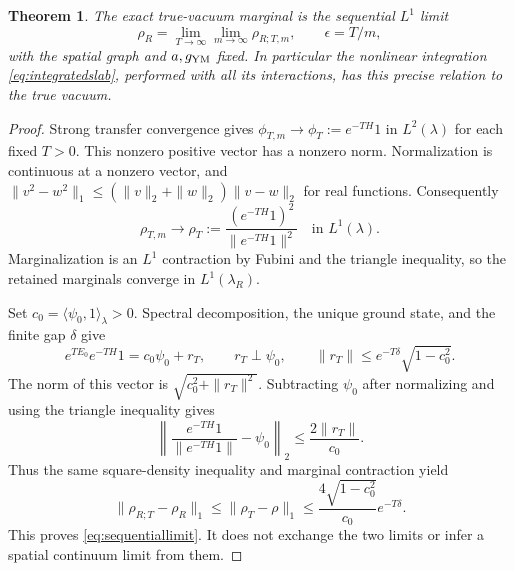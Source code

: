 \documentclass[11pt]{article}
\newtheorem{theorem}{Theorem}
\begin{document}
\begin{theorem}\label{thm:slablimit}
The exact true-vacuum marginal is the sequential $L^1$ limit
\begin{equation}\label{eq:sequentiallimit}
 \rho_R=\lim_{T\to\infty}\lim_{m\to\infty}\rho_{R;T,m},
 \qquad\epsilon=T/m,
\end{equation}
with the spatial graph and $a,g_{\rm YM}$ fixed. In particular the
nonlinear integration \eqref{eq:integratedslab}, performed with all
its interactions, has this precise relation to the true vacuum.
\end{theorem}
\begin{proof}
Strong transfer convergence gives
$\phi_{T,m}\to\phi_T:=e^{-TH}1$ in $L^2(\lambda)$ for each fixed
$T>0$. This nonzero positive vector has a nonzero norm. Normalization
is continuous at a nonzero vector, and
$\|v^2-w^2\|_1\leq(\|v\|_2+\|w\|_2)\|v-w\|_2$ for real
functions. Consequently
\[
 \rho_{T,m}\longrightarrow
 \rho_T:=\frac{(e^{-TH}1)^2}{\|e^{-TH}1\|^2}
 \quad\text{in }L^1(\lambda).
\]
Marginalization is an $L^1$ contraction by Fubini and the triangle
inequality, so the retained marginals converge in $L^1(\lambda_R)$.

Set $c_0=\langle\psi_0,1\rangle_\lambda>0$. Spectral decomposition,
the unique ground state, and the finite gap $\delta$ give
\[
 e^{TE_0}e^{-TH}1=c_0\psi_0+r_T,\qquad
 r_T\perp\psi_0,\qquad
 \|r_T\|\leq e^{-T\delta}\sqrt{1-c_0^2}.
\]
The norm of this vector is $\sqrt{c_0^2+\|r_T\|^2}$. Subtracting
$\psi_0$ after normalizing and using the triangle inequality gives
\[
 \left\|\frac{e^{-TH}1}{\|e^{-TH}1\|}-\psi_0\right\|_2
 \leq\frac{2\|r_T\|}{c_0}.
\]
Thus the same square-density inequality and marginal contraction yield
\begin{equation}\label{eq:vacuumerror}
 \|\rho_{R;T}-\rho_R\|_1
 \leq\|\rho_T-\rho\|_1
 \leq\frac{4\sqrt{1-c_0^2}}{c_0}e^{-T\delta}.
\end{equation}
This proves \eqref{eq:sequentiallimit}. It does not exchange the two
limits or infer a spatial continuum limit from them.
\end{proof}
\end{document}
